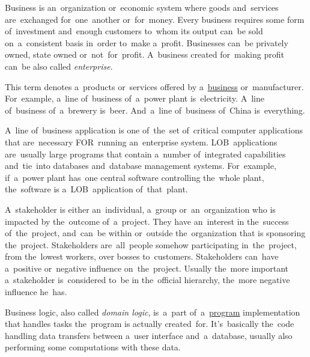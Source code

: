 \label{business}
Business is an~organization or~economic system where goods and~services are~exchanged for~one~another or~for~money.
Every business requires some form of~investment and~enough customers to~whom its output can~be sold on~a~consistent basis in~order to~make a~profit.
Businesses can~be privately owned, state owned or~not~for~profit.
A~business created for~making profit can~be also called \textit{enterprise}.

This term denotes a~products or~services offered by a~\hyperref[business]{business} or~manufacturer.
For~example, a~line of~business of~a~power plant is~electricity.
A~line of~business of~a~brewery is~beer.
And~a~line of~business of~China is~everything.

A~line of~business application is one of~the~set of~critical computer applications that are~necessary FOR~running an~enterprise system.
LOB~applications are~usually large programs that contain a~number of~integrated capabilities and~tie~into databases and~database management systems.
For~example, if~a~power plant has~one central software controlling the~whole plant, the~software is a~LOB~application of~that~plant.

A~stakeholder is either an~individual, a~group or~an~organization who is impacted by the~outcome of~a~project.
They have an~interest in the~success of~the~project, and~can~be within or~outside the~organization that is sponsoring the~project.
Stakeholders are~all~people somehow participating in~the~project, from the~lowest workers, over bosses to~customers.
Stakeholders can~have a~positive or~negative influence on~the~project.
Usually the~more important a~stakeholder is~considered to~be in the~official hierarchy, the~more negative influence he~has.
\newpage

\label{businesslogic}
Business logic, also called \textit{domain logic}, is~a~part of~a~\hyperref[applicationprocessprogramservicethread]{program} implementation that handles tasks the~program is actually created~for.
It's~basically the~code handling data transfers between a~user interface and~a~database, usually also performing some computations with these data.

